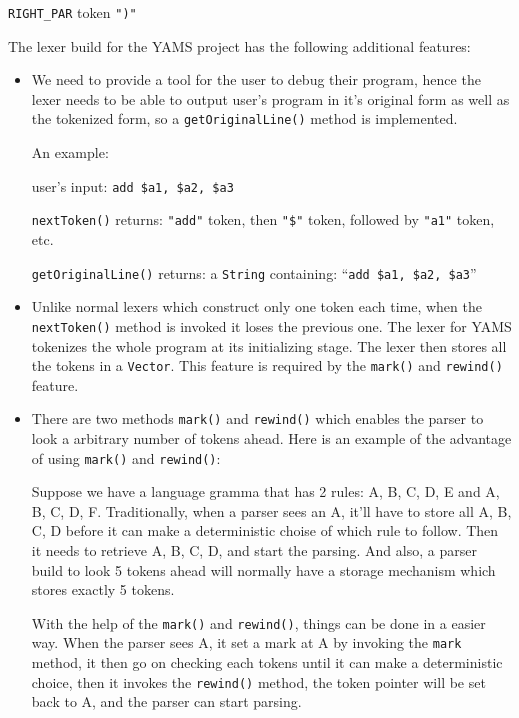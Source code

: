 \texttt{RIGHT\_PAR} token \texttt{")"}

The lexer build for the YAMS project has the following additional features:

\begin{itemize}

\item We need to provide a tool for the user to debug their
program, hence the lexer needs to be able to output user's program
in it's original form as well as the tokenized form, so a
\texttt{getOriginalLine()} method is implemented.

An example:

user's input: \texttt{add \$a1, \$a2, \$a3}

\texttt{nextToken()} returns: \texttt{"add"} token, then
\texttt{"\$"} token, followed by \texttt{"a1"} token, etc.

\texttt{getOriginalLine()} returns: a \texttt{String} containing:
``\texttt{add \$a1, \$a2, \$a3}''

\item Unlike normal lexers which construct only one token each
time, when the \texttt{nextToken()} method is invoked it loses the
previous one. The lexer for YAMS tokenizes the whole program at its
initializing stage. The lexer then stores all the tokens in
a \texttt{Vector}. This feature is required by the \texttt{mark()} and 
\texttt{rewind()} feature.

\item There are two methods \texttt{mark()} and \texttt{rewind()} which
enables the parser to look a arbitrary number of tokens ahead. Here is an
example of the advantage of using \texttt{mark()} and \texttt{rewind()}:

Suppose we have a language gramma that has 2 rules: A, B, C, D, E and A, B,
C, D, F. Traditionally, when a parser sees an A, it'll have to store all A,
B, C, D before it can make a deterministic choise of which rule to follow.
Then it needs to retrieve A, B, C, D, and start the parsing. And also, a
parser build to look 5 tokens ahead will normally have a storage mechanism
which stores exactly 5 tokens.

With the help of the \texttt{mark()} and \texttt{rewind()}, things can be
done in a easier way. When the parser sees A, it set a mark at A by invoking
the \texttt{mark} method, it then go on checking each tokens until it can
make a deterministic choice, then it invokes the \texttt{rewind()} method,
the token pointer will be set back to A, and the parser can start parsing.


\end{itemize}
